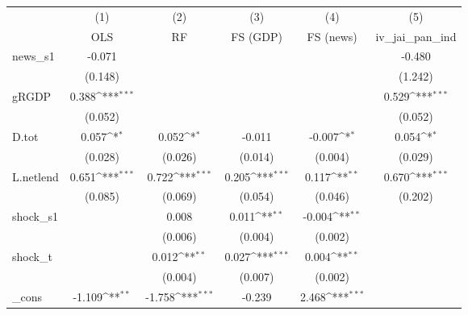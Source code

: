 {
\def\sym#1{\ifmmode^{#1}\else\(^{#1}\)\fi}
\begin{tabular}{l*{5}{c}}
\toprule
            &\multicolumn{1}{c}{(1)}&\multicolumn{1}{c}{(2)}&\multicolumn{1}{c}{(3)}&\multicolumn{1}{c}{(4)}&\multicolumn{1}{c}{(5)}\\
            &\multicolumn{1}{c}{OLS}&\multicolumn{1}{c}{RF}&\multicolumn{1}{c}{FS (GDP)}&\multicolumn{1}{c}{FS (news)}&\multicolumn{1}{c}{iv\_jai\_pan\_ind}\\
\midrule
news\_s1     &      -0.071         &                     &                     &                     &      -0.480         \\
            &     (0.148)         &                     &                     &                     &     (1.242)         \\
\addlinespace
gRGDP       &       0.388\sym{***}&                     &                     &                     &       0.529\sym{***}\\
            &     (0.052)         &                     &                     &                     &     (0.052)         \\
\addlinespace
D.tot       &       0.057\sym{*}  &       0.052\sym{*}  &      -0.011         &      -0.007\sym{*}  &       0.054\sym{*}  \\
            &     (0.028)         &     (0.026)         &     (0.014)         &     (0.004)         &     (0.029)         \\
\addlinespace
L.netlend   &       0.651\sym{***}&       0.722\sym{***}&       0.205\sym{***}&       0.117\sym{**} &       0.670\sym{***}\\
            &     (0.085)         &     (0.069)         &     (0.054)         &     (0.046)         &     (0.202)         \\
\addlinespace
shock\_s1    &                     &       0.008         &       0.011\sym{**} &      -0.004\sym{**} &                     \\
            &                     &     (0.006)         &     (0.004)         &     (0.002)         &                     \\
\addlinespace
shock\_t     &                     &       0.012\sym{**} &       0.027\sym{***}&       0.004\sym{**} &                     \\
            &                     &     (0.004)         &     (0.007)         &     (0.002)         &                     \\
\addlinespace
\_cons      &      -1.109\sym{**} &      -1.758\sym{***}&      -0.239         &       2.468\sym{***}&                     \\

\end{tabular}}

